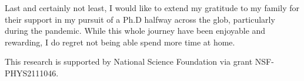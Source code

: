 \documentclass[../main.tex]{subfiles}
\begin{document}
\begin{acknowledgments}
	Last and certainly not least, I would like to extend my gratitude to my family
	for their support in my pursuit of a Ph.D halfway across the glob, particularly
	during the pandemic. While this whole journey have been enjoyable and rewarding,
	I do regret not being able spend more time at home.

	This research is supported by National Science Foundation via grant NSF-PHYS2111046.

\end{acknowledgments}
\end{document}
